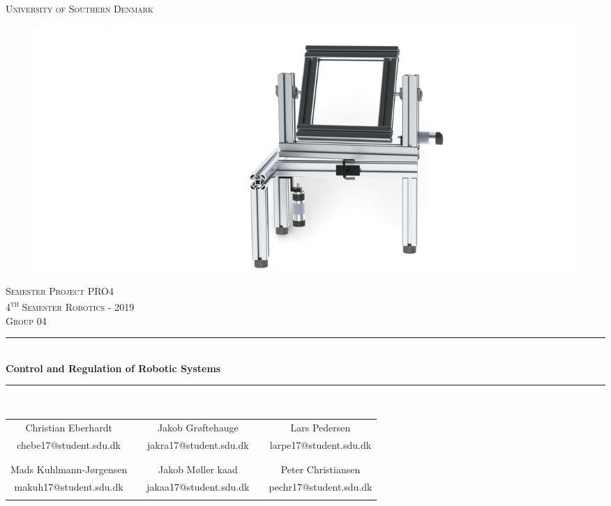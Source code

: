 \begin{titlepage}

\begin{center}
\textsc{\LARGE University of Southern Denmark}\\[1.5cm]

\begin{figure}[h]
\hspace{-3em}
\includegraphics[width=1
\textwidth]{Sections/Miscellaneous/Images/FrontPagePicture.JPG}
\end{figure}


\textsc{Semester Project PRO4}\\[0.4cm]

\textsc{\large 4\textsuperscript{th} Semester Robotics - 2019}\\[0.4cm]
\textsc{\large Group 04}\\[0.4cm]


\rule{\linewidth}{0.5mm}\\[0.3cm]
{ \LARGE \bfseries Control and Regulation of Robotic Systems \\[0.3cm]}
\rule{\linewidth}{0.5mm}\\[1.2cm]

\begin{table}[h]
\centering
\begin{tabular}{ccccc}
                       \cline{1-1}  \cline{3-3}  \cline{5-5} 
Christian Eberhardt &  & Jakob Grøftehauge   &  & Lars Pedersen       \\
chebe17@student.sdu.dk &  & jakra17@student.sdu.dk &  & larpe17@student.sdu.dk \\ 
                       &  &                        &  &                       \\ 
                       &  &                        &  &                        \\
                                              \cline{1-1} \cline{3-3}  \cline{5-5}
Mads Kuhlmann-Jørgensen          &  & Jakob Møller kaad &  & Peter Christiansen     \\
makuh17@student.sdu.dk &  &                jakaa17@student.sdu.dk     &  & pechr17@student.sdu.dk  \\  
                       &  &                        &  &                        \\ 
\end{tabular}
\end{table}




\end{center}
\end{titlepage}
